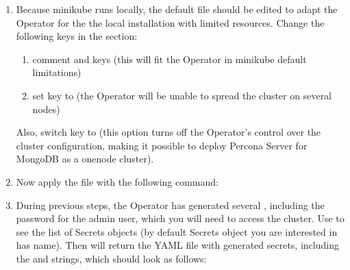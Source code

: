 \documentclass[letterpaper,10pt,english]{sphinxmanual}
\begin{document}
\begin{enumerate}
\item {} 
Because minikube runs locally, the default  file should
be edited to adapt the Operator for the the local installation with limited
resources. Change the following keys in the  section:
\begin{enumerate}
%
\item {} 
comment  and  keys
(this will fit the Operator in minikube default limitations)

\item {} 
set  key to  (the Operator
will be unable to spread the cluster on several nodes)

\end{enumerate}

Also, switch  key to  (this option turns
off the Operator’s control over the cluster configuration, making it possible to
deploy Percona Server for MongoDB as a one\sphinxhyphen{}node cluster).

\item {} 
Now apply the  file with the following command:

\begin{sphinxVerbatim}[commandchars=\\\{\}]
   
\end{sphinxVerbatim}

\item {} 
During previous steps, the Operator has generated several ,
including the password for the admin user, which you will need to access the
cluster. Use  to see the list of Secrets objects (by
default Secrets object you are interested in has 
name). Then  will return
the YAML file with generated secrets, including the 
and  strings, which should look as follows:


\end{enumerate}
\end{document}
